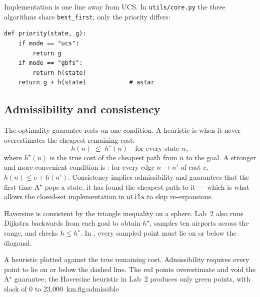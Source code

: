 Implementation is one line away from UCS. In \texttt{utils/core.py} the three algorithms share \texttt{best\_first}; only the priority differs:

\begin{lstlisting}[style=utppython]
def priority(state, g):
    if mode == "ucs":
        return g
    if mode == "gbfs":
        return h(state)
    return g + h(state)            # astar
\end{lstlisting}

\subsection{Admissibility and consistency}

The optimality guarantee rests on one condition. A heuristic is  when it never overestimates the cheapest remaining cost:
\[
h(n)\;\le\;h^\star(n)\quad\text{for every state } n,
\]
where $h^\star(n)$ is the true cost of the cheapest path from $n$ to the goal. A stronger and more convenient condition is : for every edge $n\to n'$ of cost $c$, $h(n)\le c+h(n')$. Consistency implies admissibility and guarantees that the first time A$^\star$ pops a state, it has found the cheapest path to it --- which is what allows the closed-set implementation in \texttt{utils} to skip re-expansions.

Haversine is consistent by the triangle inequality on a sphere. Lab~2 also runs Dijkstra backwards from each goal to obtain $h^\star$, samples ten airports across the range, and checks $h\le h^\star$. In , every sampled point must lie on or below the diagonal.

\begin{utpfig}{A heuristic plotted against the true remaining cost. Admissibility requires every point to lie on or below the dashed line. The red points overestimate and void the A$^\star$ guarantee; the Haversine heuristic in Lab~2 produces only green points, with slack of 0 to 23,000~km.}{fig:admissible}
\end{utpfig}

